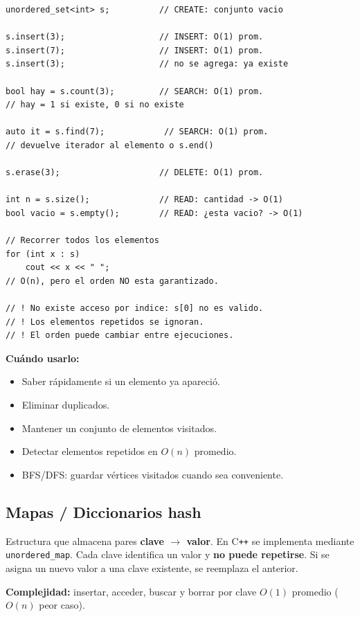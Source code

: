 \documentclass[10pt,a4paper,twocolumn]{article}
\begin{document}
\begin{lstlisting}[style=cpp]
unordered_set<int> s;          // CREATE: conjunto vacio

s.insert(3);                   // INSERT: O(1) prom.
s.insert(7);                   // INSERT: O(1) prom.
s.insert(3);                   // no se agrega: ya existe

bool hay = s.count(3);         // SEARCH: O(1) prom.
// hay = 1 si existe, 0 si no existe

auto it = s.find(7);            // SEARCH: O(1) prom.
// devuelve iterador al elemento o s.end()

s.erase(3);                    // DELETE: O(1) prom.

int n = s.size();              // READ: cantidad -> O(1)
bool vacio = s.empty();        // READ: ¿esta vacio? -> O(1)

// Recorrer todos los elementos
for (int x : s)
    cout << x << " ";
// O(n), pero el orden NO esta garantizado.

// ! No existe acceso por indice: s[0] no es valido.
// ! Los elementos repetidos se ignoran.
// ! El orden puede cambiar entre ejecuciones.
\end{lstlisting}

\textbf{Cuándo usarlo:}
\begin{itemize}
    \item Saber rápidamente si un elemento ya apareció.
    \item Eliminar duplicados.
    \item Mantener un conjunto de elementos visitados.
    \item Detectar elementos repetidos en $O(n)$ promedio.
    \item BFS/DFS: guardar vértices visitados cuando sea conveniente.
\end{itemize}


\subsection{Mapas / Diccionarios hash}

Estructura que almacena pares \textbf{clave $\rightarrow$ valor}.
En C\texttt{++} se implementa mediante \texttt{unordered\_map}.
Cada clave identifica un valor y \textbf{no puede repetirse}. Si se
asigna un nuevo valor a una clave existente, se reemplaza el anterior.

\textbf{Complejidad:} insertar, acceder, buscar y borrar por clave
$O(1)$ promedio ($O(n)$ peor caso).
\end{document}
